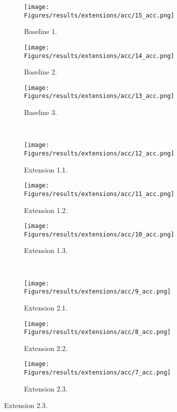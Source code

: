 \begin{figure}[!htb]
    \centering
    \begin{subfigure}{.325\textwidth}
        \centering
        \texttt{[image: Figures/results/extensions/acc/15\_acc.png]}
        \caption{Baseline 1.}
    \end{subfigure}
    \begin{subfigure}{.325\textwidth}
        \centering
        \texttt{[image: Figures/results/extensions/acc/14\_acc.png]}
        \caption{Baseline 2.}
    \end{subfigure}
    \begin{subfigure}{.325\textwidth}
        \centering
        \texttt{[image: Figures/results/extensions/acc/13\_acc.png]}
        \caption{Baseline 3.}
    \end{subfigure}
    \\
    \begin{subfigure}{.325\textwidth}
        \centering
        \texttt{[image: Figures/results/extensions/acc/12\_acc.png]}
        \caption{Extension 1.1.}
    \end{subfigure}
    \begin{subfigure}{.325\textwidth}
        \centering
        \texttt{[image: Figures/results/extensions/acc/11\_acc.png]}
        \caption{Extension 1.2.}
    \end{subfigure}
    \begin{subfigure}{.325\textwidth}
        \centering
        \texttt{[image: Figures/results/extensions/acc/10\_acc.png]}
        \caption{Extension 1.3.}
    \end{subfigure}
    \\
    \begin{subfigure}{.325\textwidth}
        \centering
        \texttt{[image: Figures/results/extensions/acc/9\_acc.png]}
        \caption{Extension 2.1.}
    \end{subfigure}
    \begin{subfigure}{.325\textwidth}
        \centering
        \texttt{[image: Figures/results/extensions/acc/8\_acc.png]}
        \caption{Extension 2.2.}
    \end{subfigure}
    \begin{subfigure}{.325\textwidth}
        \centering
        \texttt{[image: Figures/results/extensions/acc/7\_acc.png]}
        \caption{Extension 2.3.}
    \end{subfigure}

\end{figure}
